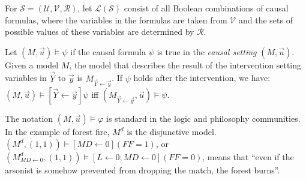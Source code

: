 \documentclass{article}
\begin{document}
For $\mathcal{S}=(\mathcal{U}, \mathcal{V}, \mathcal{R})$, let $\mathcal{L}(\mathcal{S})$ consist of all Boolean combinations of causal formulas, where the variables in the formulas are taken from $\mathcal{V}$ and the sets of possible values of these variables are determined by $\mathcal{R}$.

Let $(M, \vec{u}) \models \psi$ if the causal formula $\psi$ is true in the \textit{causal setting} $(M, \vec{u})$. Given a model $M$, the model that describes the result of the intervention setting variables in $\vec{Y}$ to $\vec{y}$ is $M_{\vec{Y} \leftarrow \vec{y}}$. If $\psi$ holds after the intervention, we have: $(M, \vec{u})\models[\vec{Y} \leftarrow \vec{y}] \psi$ iff $(M_{\vec{Y} \leftarrow \vec{y}}, \vec{u})\models\psi$.

The notation $(M, \vec{u}) \models \varphi$ is standard in the logic and philosophy communities. In the example of forest fire, $M^{d}$ is the disjunctive model. $\left(M^{d},(1,1)\right) \models [MD \leftarrow 0](FF=1)$, or $\left(M_{M D \leftarrow 0}^{d},(1,1)\right) \models [L \leftarrow 0 ; M D \leftarrow 0](F F=0)$, means that ``even if the arsonist is somehow prevented from dropping the match, the forest burns''.
\end{document}
